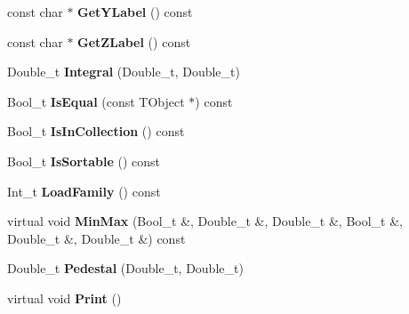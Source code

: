 \begin{DoxyCompactItemize}
\item 
\hypertarget{classTSplineFit_a5d632cff2a2ec8d3182486e007b19e14}{
const char $\ast$ {\bfseries GetYLabel} () const }
\label{classTSplineFit_a5d632cff2a2ec8d3182486e007b19e14}

\item 
\hypertarget{classTSplineFit_a6965aa3dcee389700e39cf283b85fc1f}{
const char $\ast$ {\bfseries GetZLabel} () const }
\label{classTSplineFit_a6965aa3dcee389700e39cf283b85fc1f}

\item 
\hypertarget{classTSplineFit_ab79a394dbfa3cf165253630b0970b788}{
Double\_\-t {\bfseries Integral} (Double\_\-t, Double\_\-t)}
\label{classTSplineFit_ab79a394dbfa3cf165253630b0970b788}

\item 
\hypertarget{classTSplineFit_ae681977fc645baf6704b52baa9fc52e0}{
Bool\_\-t {\bfseries IsEqual} (const TObject $\ast$) const }
\label{classTSplineFit_ae681977fc645baf6704b52baa9fc52e0}

\item 
\hypertarget{classTSplineFit_aefff9be4f38c5f4acefbc2205b6a18b8}{
Bool\_\-t {\bfseries IsInCollection} () const }
\label{classTSplineFit_aefff9be4f38c5f4acefbc2205b6a18b8}

\item 
\hypertarget{classTSplineFit_a44fa87e2412bc96ac47fe27518c7165e}{
Bool\_\-t {\bfseries IsSortable} () const }
\label{classTSplineFit_a44fa87e2412bc96ac47fe27518c7165e}

\item 
\hypertarget{classTSplineFit_a6705c3d1523e5176a9e4604a587faba9}{
Int\_\-t {\bfseries LoadFamily} () const }
\label{classTSplineFit_a6705c3d1523e5176a9e4604a587faba9}

\item 
\hypertarget{classTSplineFit_a1587e51646bff1ce59431bb5c50a2ed5}{
virtual void {\bfseries MinMax} (Bool\_\-t \&, Double\_\-t \&, Double\_\-t \&, Bool\_\-t \&, Double\_\-t \&, Double\_\-t \&) const }
\label{classTSplineFit_a1587e51646bff1ce59431bb5c50a2ed5}

\item 
\hypertarget{classTSplineFit_a7588873942e58c23fdc451f65cb4d8c6}{
Double\_\-t {\bfseries Pedestal} (Double\_\-t, Double\_\-t)}
\label{classTSplineFit_a7588873942e58c23fdc451f65cb4d8c6}

\item 
\hypertarget{classTSplineFit_a65e9cef2d8660b9f03cbe960e569d7f1}{
virtual void {\bfseries Print} ()}
\label{classTSplineFit_a65e9cef2d8660b9f03cbe960e569d7f1}


\end{DoxyCompactItemize}
